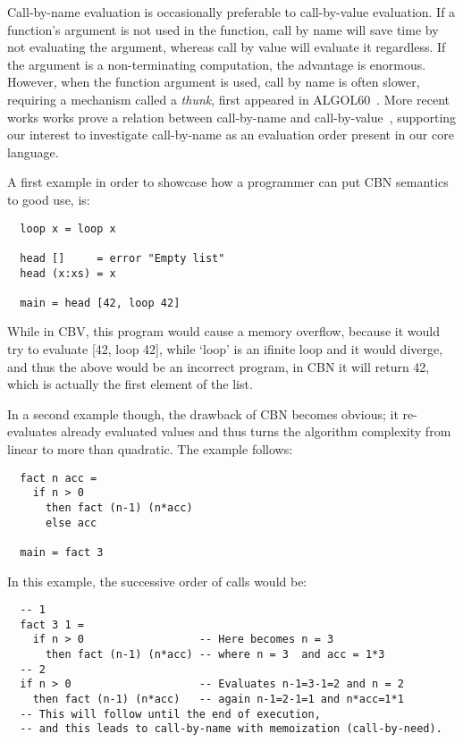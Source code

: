\documentclass[diploma]{softlab-thesis}
\begin{document}
Call-by-name evaluation is occasionally preferable to call-by-value evaluation. If a function's 
argument is not used in the function, call by name will save time by not evaluating the argument, 
whereas call by value will evaluate it regardless. If the argument is a non-terminating computation, 
the advantage is enormous. However, when the function argument is used, call by name is often slower, 
requiring a mechanism called a \emph{thunk}, first appeared in ALGOL60~\cite{Naur78}. More recent works 
works prove a relation between call-by-name and call-by-value~\cite{Wadler03}, supporting our interest 
to investigate call-by-name as an evaluation order present in our core language.

A first example in order to showcase how a programmer can put CBN semantics to good use, is:

\begin{verbatim}
  loop x = loop x

  head []     = error "Empty list"
  head (x:xs) = x

  main = head [42, loop 42]
\end{verbatim}

While in CBV, this program would cause a memory overflow, because it would try to evaluate [42, loop 42],
while `loop' is an ifinite loop and it would diverge, and thus the above would be an incorrect program, 
in CBN it will return 42, which is actually the first element of the list.

In a second example though, the drawback of CBN becomes obvious; it re-evaluates already evaluated values and thus 
turns the algorithm complexity from linear to more than quadratic. The example follows:

\begin{verbatim}
  fact n acc = 
    if n > 0 
      then fact (n-1) (n*acc)
      else acc

  main = fact 3
\end{verbatim}

In this example, the successive order of calls would be:
\begin{verbatim}
  -- 1 
  fact 3 1 = 
    if n > 0                  -- Here becomes n = 3
      then fact (n-1) (n*acc) -- where n = 3  and acc = 1*3
  -- 2
  if n > 0                    -- Evaluates n-1=3-1=2 and n = 2 
    then fact (n-1) (n*acc)   -- again n-1=2-1=1 and n*acc=1*1
  -- This will follow until the end of execution, 
  -- and this leads to call-by-name with memoization (call-by-need).
\end{verbatim}
\end{document}
